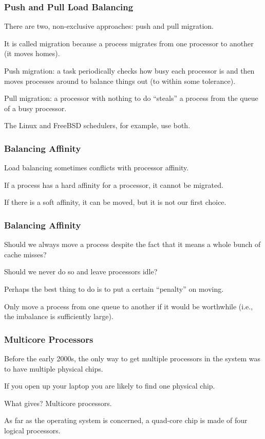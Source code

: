 \begin{frame}
\frametitle{Push and Pull Load Balancing}

There are two, non-exclusive approaches: \alert{push} and \alert{pull} migration. 

It is called migration because a process migrates from one processor to another (it moves homes). 

Push migration: a task periodically checks how busy each processor is and then moves processes around to balance things out (to within some tolerance). 

Pull migration: a processor with nothing to do ``steals'' a process from the queue of a busy processor. 

The Linux and FreeBSD schedulers, for example, use both.

\end{frame}

\begin{frame}
\frametitle{Balancing Affinity}

Load balancing sometimes conflicts with processor affinity. 

If a process has a hard affinity for a processor, it cannot be migrated. 

If there is a soft affinity, it can be moved, but it is not our first choice.

\end{frame}

\begin{frame}
\frametitle{Balancing Affinity}

Should we always move a process despite the fact that it means a whole bunch of cache misses?

Should we never do so and leave processors idle? 

Perhaps the best thing to do is to put a certain ``penalty'' on moving.

Only move a process from one queue to another if it would be worthwhile (i.e., the imbalance is sufficiently large).

\end{frame}

\begin{frame}
\frametitle{Multicore Processors}

Before the early 2000s, the only way to get multiple processors in the system was to have multiple physical chips. 

If you open up your laptop you are likely to find one physical chip. 

What gives? \alert{Multicore processors}. 

As far as the operating system is concerned, a quad-core chip is made of four logical processors.

\end{frame}

